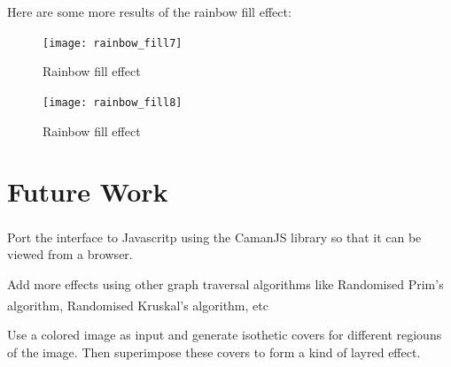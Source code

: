 \documentclass[12pt]{article}
\begin{document}
\vspace{2.5cm}
Here are some more results of the rainbow fill effect:
\begin{figure}[H]
	\centering
	\texttt{[image: rainbow\_fill7]}
	\caption{Rainbow fill effect}
	\label{fig:fig_rainbow_fill2}
\end{figure}

\begin{figure}[H]
	\centering
	\texttt{[image: rainbow\_fill8]}
	\caption{Rainbow fill effect}
	\label{fig:fig_rainbow_fill2}
\end{figure}
\vspace{3cm}

\section{Future Work}
\begin{itemize}
	{
	\item Port the interface to Javascritp using the CamanJS library \textsuperscript{\cite{ref6}} so that it can be viewed from a browser.
	}
	{
	\item Add more effects using other graph traversal algorithms like 
	Randomised Prim's algorithm\textsuperscript{\cite{ref5}}, Randomised Kruskal's algorithm\textsuperscript{\cite{ref7}}, etc
	}
	{
	\item Use a colored image as input and generate isothetic covers for different regiouns of the image. Then superimpose these covers to form a kind of layred effect.
	}
\end{itemize}



\newpage
\end{document}
